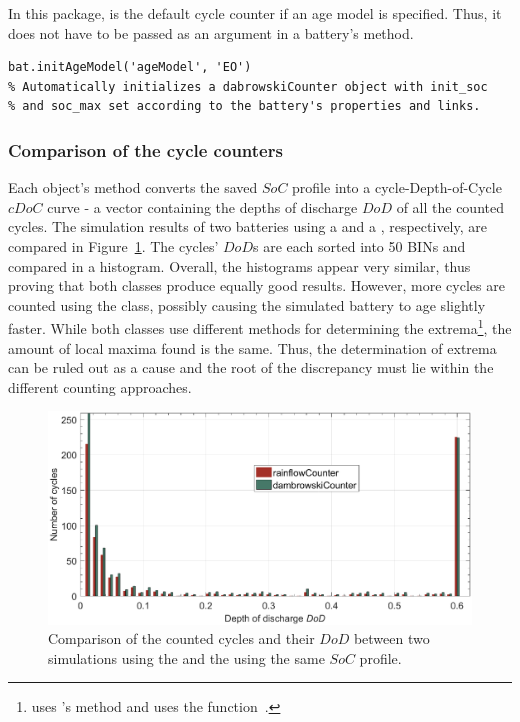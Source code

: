 In this package,  is the default cycle counter if an age model is specified. Thus, it does not have to be passed as an argument in a battery's  method.
\begin{lstlisting}
bat.initAgeModel('ageModel', 'EO')
% Automatically initializes a dabrowskiCounter object with init_soc
% and soc_max set according to the battery's properties and links.
\end{lstlisting}

\subsubsection{Comparison of the cycle counters}
Each  object's  method converts the saved $SoC$ profile into a cycle-Depth-of-Cycle $cDoC$ curve - a vector containing the depths of discharge $DoD$ of all the counted cycles. The simulation results of two batteries using a  and a , respectively, are compared in Figure~\ref{fig:cdoc_hists}. The cycles' $DoD$s are each sorted into 50 BINs and compared in a histogram. Overall, the histograms appear very similar, thus proving that both classes produce equally good results. However, more cycles are counted using the  class, possibly causing the simulated battery to age slightly faster. While both classes use different methods for determining the extrema\footnote{ uses 's  method and  uses the  function~\cite{nieslony_rainflow_2010}.}, the amount of local maxima found is the same. Thus, the determination of extrema can be ruled out as a cause and the root of the discrepancy must lie within the different counting approaches.
\begin{figure}[t!]
	\captionsetup{type=figure}
	\centering
	\includegraphics[width=\textwidth]{cdoc_hists}
	\caption[Comparison of the counted cycles and their $DoD$ between two simulations using the  and the  using the same $SoC$ profile]{Comparison of the counted cycles and their $DoD$ between two simulations using the  and the  using the same $SoC$ profile.}
	\label{fig:cdoc_hists}
\end{figure}

